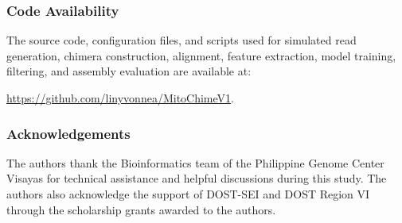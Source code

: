\documentclass[runningheads]{llncs}
\newif\ifanonymized
\begin{document}
\subsubsection*{Code Availability}

The source code, configuration files, and scripts used for simulated read generation, chimera construction, alignment, feature extraction, model training, filtering, and assembly evaluation are available at:

\url{https://github.com/linyvonnea/MitoChimeV1}.

\subsubsection*{Acknowledgements}
\ifanonymized
The authors thank an external bioinformatics support team for technical assistance and helpful discussions during this study.
\else
The authors thank the Bioinformatics team of the Philippine Genome Center Visayas for technical assistance and helpful discussions during this study. The authors also acknowledge the support of DOST-SEI and DOST Region VI through the scholarship grants awarded to the authors.
\fi



\end{document}
